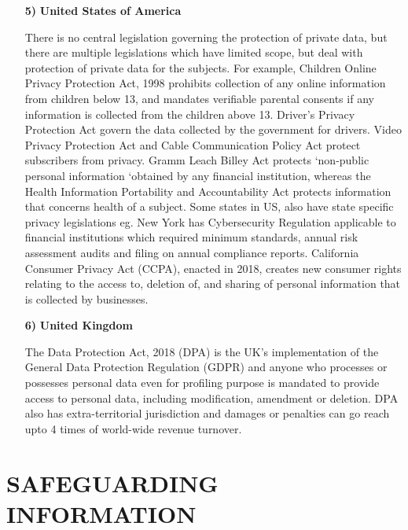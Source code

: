 \begin{multicols}{2}
\begin{itemize}
\item[{\bf 5)}] \textbf{United States of America}

There is no central legislation governing the protection of private data, but there are multiple legislations which have limited scope, but deal with protection of private data for the subjects. For example, Children Online Privacy Protection Act, 1998 prohibits collection of any online information from children below 13, and mandates verifiable parental consents if any information is collected from the children above 13. Driver’s Privacy Protection Act govern the data collected by the government for drivers. Video Privacy Protection Act and Cable Communication Policy Act protect subscribers from privacy. Gramm Leach Billey Act protects ‘non-public personal information ‘obtained by any financial institution, whereas the Health Information Portability and Accountability Act protects information that concerns health of a subject. Some states in US, also have state specific privacy legislations eg. New York has Cybersecurity Regulation applicable to financial institutions which required minimum standards, annual risk assessment audits and filing on annual compliance reports. California Consumer Privacy Act (CCPA), enacted in 2018, creates new consumer rights relating to the access to, deletion of, and sharing of personal information that is collected by businesses.

\item[{\bf 6)}]\textbf{United Kingdom}

The Data Protection Act, 2018 (DPA) is the UK’s implementation of the General Data Protection Regulation (GDPR) and anyone who processes or possesses personal data even for profiling purpose is mandated to provide access to personal data, including modification, amendment or deletion. DPA also has extra-territorial jurisdiction and damages or penalties can go reach upto 4 times of world-wide revenue turnover.
\end{itemize}

\section{SAFEGUARDING INFORMATION}


\end{multicols}
